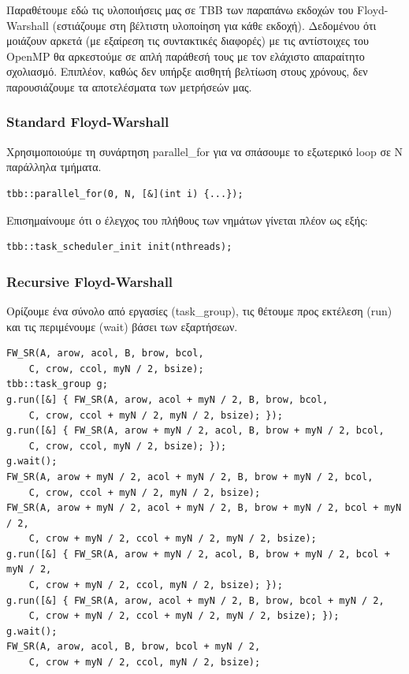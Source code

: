 \documentclass[12pt,titlepage]{article}
\begin{document}
Παραθέτουμε εδώ τις υλοποιήσεις μας σε TBB των παραπάνω εκδοχών του
Floyd-Warshall (εστιάζουμε στη βέλτιστη υλοποίηση για κάθε εκδοχή). Δεδομένου
ότι μοιάζουν αρκετά (με εξαίρεση τις συντακτικές διαφορές) με τις αντίστοιχες
του OpenMP θα αρκεστούμε σε απλή παράθεσή τους με τον ελάχιστο απαραίτητο
σχολιασμό. Επιπλέον, καθώς δεν υπήρξε αισθητή βελτίωση στους χρόνους, δεν
παρουσιάζουμε τα αποτελέσματα των μετρήσεών μας.

\subsubsection*{Standard Floyd-Warshall}

Χρησιμοποιούμε τη συνάρτηση parallel\_for για να σπάσουμε το εξωτερικό loop σε N
παράλληλα τμήματα.

\begin{verbatim}
tbb::parallel_for(0, N, [&](int i) {...});
\end{verbatim}

Επισημαίνουμε ότι ο έλεγχος του πλήθους των νημάτων γίνεται πλέον ως εξής:

\begin{verbatim}
tbb::task_scheduler_init init(nthreads);
\end{verbatim}

\subsubsection*{Recursive Floyd-Warshall}

Ορίζουμε ένα σύνολο από εργασίες (task\_group), τις θέτουμε προς εκτέλεση (run)
και τις περιμένουμε (wait) βάσει των εξαρτήσεων.

\begin{verbatim}
FW_SR(A, arow, acol, B, brow, bcol,
    C, crow, ccol, myN / 2, bsize);
tbb::task_group g;
g.run([&] { FW_SR(A, arow, acol + myN / 2, B, brow, bcol,
    C, crow, ccol + myN / 2, myN / 2, bsize); });
g.run([&] { FW_SR(A, arow + myN / 2, acol, B, brow + myN / 2, bcol,
    C, crow, ccol, myN / 2, bsize); });
g.wait();
FW_SR(A, arow + myN / 2, acol + myN / 2, B, brow + myN / 2, bcol,
    C, crow, ccol + myN / 2, myN / 2, bsize);
FW_SR(A, arow + myN / 2, acol + myN / 2, B, brow + myN / 2, bcol + myN / 2,
    C, crow + myN / 2, ccol + myN / 2, myN / 2, bsize);
g.run([&] { FW_SR(A, arow + myN / 2, acol, B, brow + myN / 2, bcol + myN / 2,
    C, crow + myN / 2, ccol, myN / 2, bsize); });
g.run([&] { FW_SR(A, arow, acol + myN / 2, B, brow, bcol + myN / 2,
    C, crow + myN / 2, ccol + myN / 2, myN / 2, bsize); });
g.wait();
FW_SR(A, arow, acol, B, brow, bcol + myN / 2,
    C, crow + myN / 2, ccol, myN / 2, bsize);
\end{verbatim}
\end{document}
